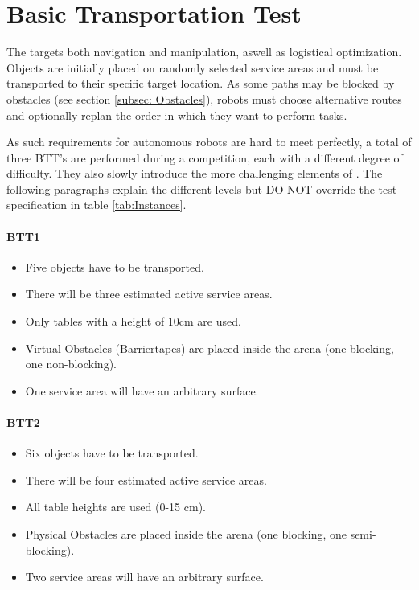 
\section{Basic Transportation Test}
\label{sec:Basic Transportation Test}

The  targets both navigation and manipulation, aswell as logistical optimization. Objects are initially placed on randomly selected service areas and must be transported to their specific target location. As some paths may be blocked by obstacles (see section \ref{subsec: Obstacles}), robots must choose alternative routes and optionally replan the order in which they want to perform tasks.

As such requirements for autonomous robots are hard to meet perfectly,
a total of three BTT's are performed during a competition, each with a different degree of difficulty.
They also slowly introduce the more challenging elements of \RCAW .
The following paragraphs explain the different levels but DO NOT override the test specification in table \ref{tab:Instances}.

\paragraph{BTT1}
\begin{itemize}
\item Five objects have to be transported.
\item There will be three estimated active service areas.
\item Only tables with a height of 10cm are used. 
\item Virtual Obstacles (Barriertapes) are placed inside the arena (one blocking, one non-blocking).
\item One service area will have an arbitrary surface.
\end{itemize}

\paragraph{BTT2}
\begin{itemize}
\item Six objects have to be transported.
\item There will be four estimated active service areas.
\item All table heights are used (0-15 $\si{\centi\meter}$).
\item Physical Obstacles are placed inside the arena (one blocking, one semi-blocking).
\item Two service areas will have an arbitrary surface.
\end{itemize}

